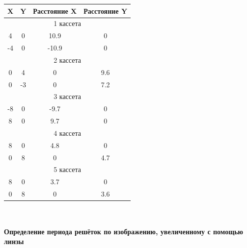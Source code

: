 \documentclass[a4paper,12pt]{extarticle}
\begin{document}
\begin{minipage}[t]{0.45\textwidth} 
   \begin{tabular}{|cccc|}
        \hline
        \multicolumn{1}{|c|}{X}  & \multicolumn{1}{c|}{Y}  & \multicolumn{1}{c|}{Расстояние X} & Расстояние Y \\ \hline
        \multicolumn{4}{|c|}{1 кассета}                                                                       \\ \hline
        \multicolumn{1}{|c|}{4}  & \multicolumn{1}{c|}{0}  & \multicolumn{1}{c|}{10.9}         & 0            \\ \hline
        \multicolumn{1}{|c|}{-4} & \multicolumn{1}{c|}{0}  & \multicolumn{1}{c|}{-10.9}        & 0            \\ \hline
        \multicolumn{4}{|c|}{2 кассета}                                                                       \\ \hline
        \multicolumn{1}{|c|}{0}  & \multicolumn{1}{c|}{4}  & \multicolumn{1}{c|}{0}            & 9.6          \\ \hline
        \multicolumn{1}{|c|}{0}  & \multicolumn{1}{c|}{-3} & \multicolumn{1}{c|}{0}            & 7.2          \\ \hline
        \multicolumn{4}{|c|}{3 кассета}                                                                       \\ \hline
        \multicolumn{1}{|c|}{-8} & \multicolumn{1}{c|}{0}  & \multicolumn{1}{c|}{-9.7}         & 0            \\ \hline
        \multicolumn{1}{|c|}{8}  & \multicolumn{1}{c|}{0}  & \multicolumn{1}{c|}{9.7}          & 0            \\ \hline
        \multicolumn{4}{|c|}{4 кассета}                                                                       \\ \hline
        \multicolumn{1}{|c|}{8}  & \multicolumn{1}{c|}{0}  & \multicolumn{1}{c|}{4.8}          & 0            \\ \hline
        \multicolumn{1}{|c|}{0}  & \multicolumn{1}{c|}{8}  & \multicolumn{1}{c|}{0}            & 4.7          \\ \hline
        \multicolumn{4}{|c|}{5 кассета}                                                                       \\ \hline
        \multicolumn{1}{|c|}{8}  & \multicolumn{1}{c|}{0}  & \multicolumn{1}{c|}{3.7}          & 0            \\ \hline
        \multicolumn{1}{|c|}{0}  & \multicolumn{1}{c|}{8}  & \multicolumn{1}{c|}{0}            & 3.6          \\ \hline
    \end{tabular}   
\end{minipage}
\\ \\ 
\textbf{\uppercase\expandafter{} Определение периода решёток по изображению, увеличенному с помощью линзы}\\ 
\end{document}
